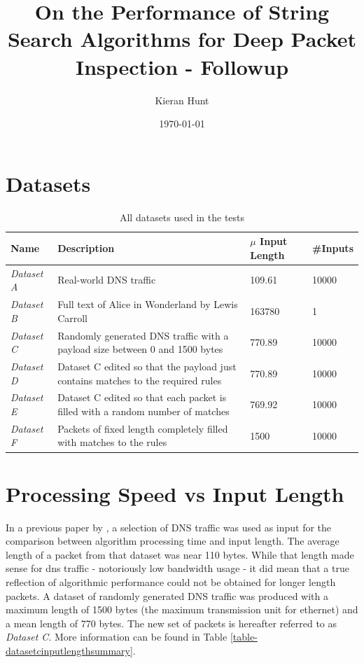 \documentclass[11pt]{article}
\begin{document}
\title{On the Performance of String Search Algorithms for Deep Packet Inspection - Followup}
\author{Kieran Hunt}
\date{\today}
\maketitle


\section{Datasets}

\begin{table}[!htb]
\centering
\begin{tabular}{@{}lp{}ll@{}}
\toprule
Name & Description & $\mu$ Input Length & \#Inputs \\ \midrule
\textit{Dataset A} & Real-world DNS traffic & 109.61 & 10000 \\
\textit{Dataset B} & Full text of Alice in Wonderland by Lewis Carroll & 163780 & 1 \\
\textit{Dataset C} & Randomly generated DNS traffic with a payload size between 0 and 1500 bytes & 770.89 & 10000 \\
\textit{Dataset D} & Dataset C edited so that the payload just contains matches to the required rules & 770.89 & 10000 \\
\textit{Dataset E} & Dataset C edited so that each packet is filled with a random number of matches & 769.92 & 10000 \\
\textit{Dataset F} & Packets of fixed length completely filled with matches to the rules & 1500 & 10000
\end{tabular}
\caption{All datasets used in the tests}
\label{table-datasets}
\end{table}

\section{Processing Speed vs Input Length} \label{sec-processingspeecvsinputlength}

In a previous paper by \citet{hunt2016}, a selection of DNS traffic was used as input for the comparison between algorithm processing time and input length. The average length of a packet from that dataset was near 110 bytes. While that length made sense for dns traffic - notoriously low bandwidth usage - it did mean that a true reflection of algorithmic performance could not be obtained for longer length packets. A dataset of randomly generated DNS traffic was produced with a maximum length of 1500 bytes (the maximum transmission unit for ethernet) and a mean length of 770 bytes. The new set of packets is hereafter referred to as \textit{Dataset C}. More information can be found in Table \ref{table-datasetcinputlengthsummary}.
\end{document}
